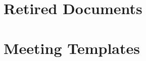 \documentclass{article}
\begin{document}
\newpage
\section{Retired Documents}

\newpage


\newpage


\newpage


\newpage



\newpage
\section{Meeting Templates}

\newpage

\newpage

\end{document}
